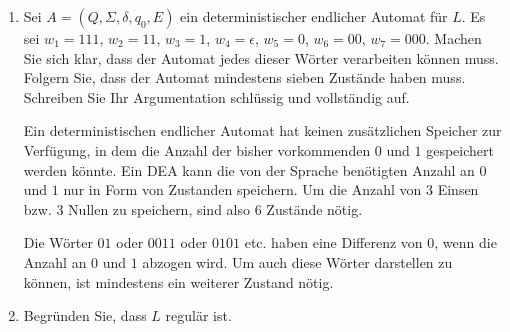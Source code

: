 \documentclass{lehramt-informatik-aufgabe}
\begin{document}
\begin{enumerate}


\item Sei $A = (Q, \Sigma, \delta, q_0 , E)$ ein deterministischer
endlicher Automat für $L$. Es sei $w_1 = 111$, $w_2 = 11$, $w_3 = 1$, $
w_4 = \epsilon$, $w_5 = 0$, $w_6 = 00$, $w_7 = 000$. Machen Sie sich
klar, dass der Automat jedes dieser Wörter verarbeiten können muss.
Folgern Sie, dass der Automat mindestens sieben Zustände haben muss.
Schreiben Sie Ihr Argumentation schlüssig und vollständig auf.

\begin{liAntwort}
Ein deterministischen endlicher Automat hat keinen zusätzlichen Speicher
zur Verfügung, in dem die Anzahl der bisher vorkommenden $0$ und $1$
gespeichert werden könnte. Ein DEA kann die von der Sprache benötigten
Anzahl an $0$ und $1$ nur in Form von Zustanden speichern. Um die Anzahl
von 3 Einsen bzw. 3 Nullen zu speichern, sind also 6 Zustände nötig.

Die Wörter $01$ oder $0011$ oder $0101$ etc. haben eine Differenz von
$0$, wenn die Anzahl an $0$ und $1$ abzogen wird. Um auch diese Wörter
darstellen zu können, ist mindestens ein weiterer Zustand nötig.
\end{liAntwort}


\item Begründen Sie, dass $L$ regulär ist.

\begin{liAntwort}
\begin{center}
\end{center}
\end{liAntwort}
\end{enumerate}
\end{document}
